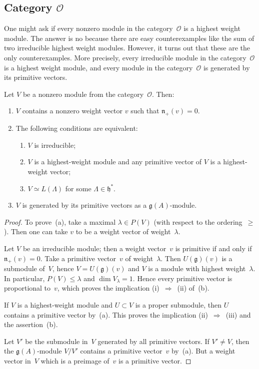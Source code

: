 \documentclass[12pt]{article}
\begin{document}
\subsection{Category $\mathcal{O}$}
One might ask if every nonzero module in the category~$\mathcal{O}$ is a highest weight module. The answer is no because there are easy counterexamples like the sum of two irreducible highest weight modules. However, it turns out that these are the only counterexamples. More precisely, every irreducible module in the category~$\mathcal{O}$ is a highest weight module, and every module in the category~$\mathcal{O}$ is generated by its primitive vectors. 
\begin{proposition}[9.3]
Let $V$ be a nonzero module from the category~$\mathcal{O}$. Then:
\begin{enumerate}[label=\textup{(\alph*)}]
  \item $V$ contains a nonzero weight vector $v$ such that $\mathfrak{n}_+(v)=0$.
  \item The following conditions are equivalent:
  \begin{enumerate}[label=\textup{(\roman*)}]
    \item $V$ is irreducible;
    \item $V$ is a highest-weight module and any primitive vector of $V$ 
          is a highest-weight vector;
    \item $V \simeq L(\Lambda)$ for some $\Lambda \in \mathfrak{h}^*$.
  \end{enumerate}
  \item $V$ is generated by its primitive vectors as a $\mathfrak{g}(A)$-module.
\end{enumerate}

\begin{proof}
To prove~(a), take a maximal $\lambda \in P(V)$ (with respect to the ordering~$\ge$).
Then one can take $v$ to be a weight vector of weight~$\lambda$.

Let $V$ be an irreducible module; then a weight vector~$v$ is primitive if and only if
$\mathfrak{n}_+(v)=0$.  Take a primitive vector~$v$ of weight~$\lambda$.  
Then $U(\mathfrak{g})(v)$ is a submodule of~$V$, hence 
$V = U(\mathfrak{g})(v)$ and $V$ is a module with highest weight~$\lambda$.
In particular, $P(V) \le \lambda$ and $\dim V_\lambda = 1$.  
Hence every primitive vector is proportional to~$v$, which proves the implication
\textup{(i)}~$\Rightarrow$~\textup{(ii)} of~(b).

If $V$ is a highest-weight module and $U \subset V$ is a proper submodule, 
then $U$ contains a primitive vector by~(a).  
This proves the implication \textup{(ii)}~$\Rightarrow$~\textup{(iii)} and the assertion~(b).

Let $V'$ be the submodule in~$V$ generated by all primitive vectors.  
If $V' \ne V$, then the $\mathfrak{g}(A)$-module $V/V'$ contains a primitive vector~$v$ by~(a).
But a weight vector in~$V$ which is a preimage of~$v$ is a primitive vector.
\end{proof}
\end{proposition}
\end{document}
